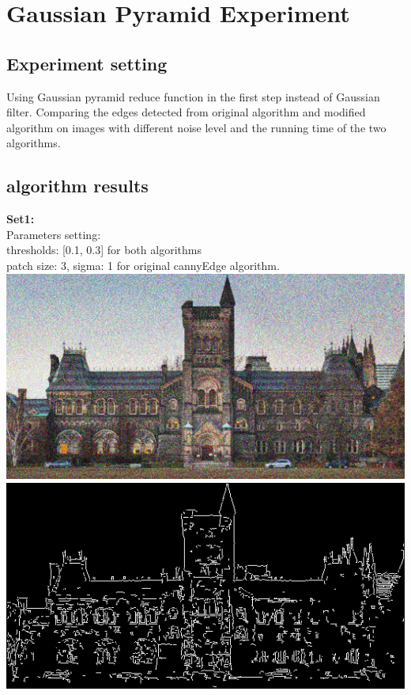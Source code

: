 \documentclass[10pt,twocolumn,letterpaper]{article}
\begin{document}
\section{Gaussian Pyramid Experiment}
\subsection{Experiment setting}
Using Gaussian pyramid reduce function in the first step instead of Gaussian filter. Comparing the edges detected from original algorithm and modified algorithm on images with different noise level and the running time of the two algorithms.
\subsection{algorithm results}
\textbf{Set1:}\\
Parameters setting:\\
thresholds: [0.1, 0.3] for both algorithms\\
patch size: 3, sigma: 1 for original cannyEdge algorithm.\\
\includegraphics[scale=0.1]{UofT-noise-40.png}
\includegraphics[scale=0.2]{pyramid_edge_noise_40.png}\\
\end{document}
